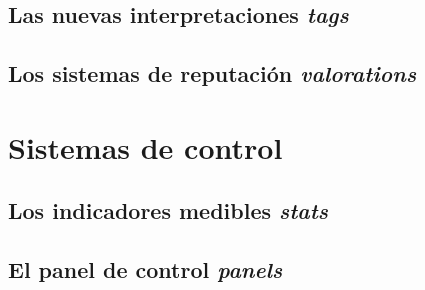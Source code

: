 \subsection{Las nuevas interpretaciones \emph{tags}}
\subsection{Los sistemas de reputación \emph{valorations}}

\section{Sistemas de control}
\subsection{Los indicadores medibles \emph{stats}}
\subsection{El panel de control \emph{panels}}
